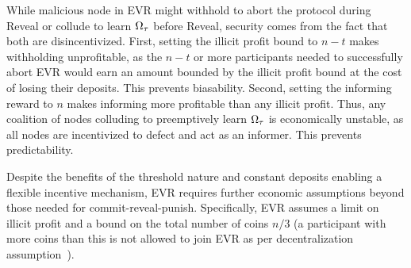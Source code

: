 While malicious node in EVR might withhold to abort the protocol during Reveal or collude to learn $\Omega_\tau$ before Reveal, security comes from the fact that both are disincentivized. First, setting the illicit profit bound to $n - t$ makes withholding unprofitable, as the $n - t$ or more participants needed to successfully abort EVR would earn an amount bounded by the illicit profit bound at the cost of losing their deposits. This prevents biasability. Second, setting the informing reward to $n$ makes informing more profitable than any illicit profit. Thus, any coalition of nodes colluding to preemptively learn $\Omega_\tau$ is economically unstable, as all nodes are incentivized to defect and act as an informer. This prevents predictability.

Despite the benefits of the threshold nature and constant deposits enabling a flexible incentive mechanism, EVR requires further economic assumptions beyond those needed for commit-reveal-punish. Specifically, EVR assumes a limit on illicit profit and a bound on the total number of coins $n / 3$ (a participant with more coins than this is not allowed to join EVR as per decentralization assumption~\cite{david2020economically}).

